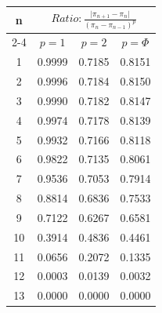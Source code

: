 \documentclass{article}
\providecommand{\abs}[1]{\lvert#1\rvert}
\begin{document}
\begin{tabular}{|c|c|c|c|}
\hline
\multirow{2}{*}{n} & \multicolumn{3}{|c|}{$Ratio:\displaystyle\frac{\abs{\pi_{n+1}-\pi_{n}}}{({\pi_{n}-\pi_{n-1}})^p}$} \\
\cline{2-4}
 & $p=1$ & $p=2$ & $p=\Phi$ \\
\hline
 1 & 0.9999 & 0.7185 & 0.8151 \\ 
  2 & 0.9996 & 0.7184 & 0.8150 \\ 
  3 & 0.9990 & 0.7182 & 0.8147 \\ 
  4 & 0.9974 & 0.7178 & 0.8139 \\ 
  5 & 0.9932 & 0.7166 & 0.8118 \\ 
  6 & 0.9822 & 0.7135 & 0.8061 \\ 
  7 & 0.9536 & 0.7053 & 0.7914 \\ 
  8 & 0.8814 & 0.6836 & 0.7533 \\ 
  9 & 0.7122 & 0.6267 & 0.6581 \\ 
 10 & 0.3914 & 0.4836 & 0.4461 \\ 
 11 & 0.0656 & 0.2072 & 0.1335 \\ 
 12 & 0.0003 & 0.0139 & 0.0032 \\ 
 13 & 0.0000 & 0.0000 & 0.0000 \\ 
 \hline 
\end{tabular}
\end{document}
